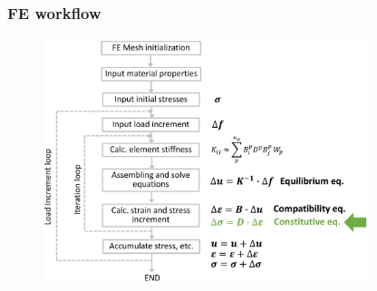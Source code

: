 \documentclass[notes]{beamer}
\begin{document}
\begin{frame}
\frametitle{FE workflow}
\begin{figure}
	\includegraphics[width=0.85\textwidth]{figs/fe-code.png}
	
\end{figure}
\end{frame}
\end{document}
